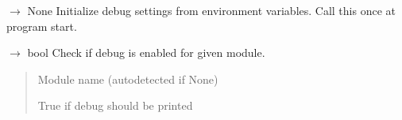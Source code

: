 \documentclass[letterpaper,10pt,english]{sphinxmanual}
\begin{document}
\begin{fulllineitems}
\label{\detokenize{core.utils.debug:core.utils.debug.init_debug_from_env}}
\pysigstartsignatures
\pysiglinewithargsret
{}
{}
{{ $\rightarrow$ None}}
\pysigstopsignatures
\sphinxAtStartPar
Initialize debug settings from environment variables.
Call this once at program start.

\end{fulllineitems}


\begin{fulllineitems}
\label{\detokenize{core.utils.debug:core.utils.debug.is_debug_enabled}}
\pysigstartsignatures
\pysiglinewithargsret
{}
{}
{{ $\rightarrow$ bool}}
\pysigstopsignatures
\sphinxAtStartPar
Check if debug is enabled for given module.
\begin{quote}\begin{description}
\sphinxAtStartPar
{} \textendash{} Module name (auto\sphinxhyphen{}detected if None)

\sphinxAtStartPar
True if debug should be printed

\end{description}\end{quote}

\end{fulllineitems}

\end{document}
